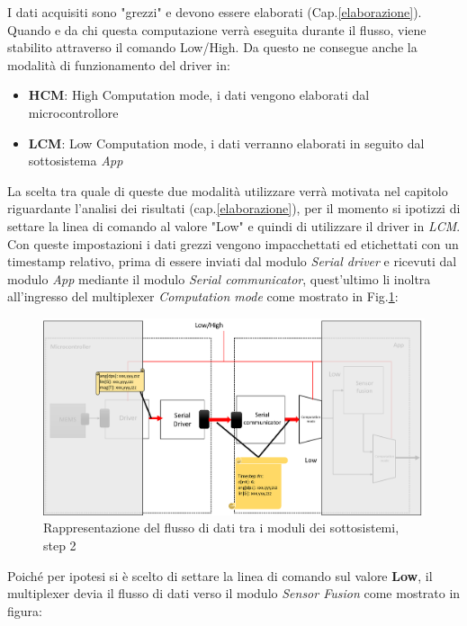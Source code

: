I dati acquisiti sono "grezzi" e devono essere elaborati (Cap.\ref{elaborazione}). Quando e da chi questa computazione verrà eseguita durante il flusso, viene stabilito attraverso il comando Low/High. Da questo ne consegue anche la modalità di funzionamento del driver in:
\begin{itemize}
	\item \textbf{HCM}: High Computation mode, i dati vengono elaborati dal microcontrollore
	\item \textbf{LCM}: Low Computation mode, i dati verranno elaborati in seguito dal sottosistema \textit{App} 
\end{itemize}
La scelta tra quale di queste due modalità utilizzare verrà motivata nel capitolo riguardante l'analisi dei risultati (cap.\ref{elaborazione}), per il momento si ipotizzi di settare la linea di comando al valore "Low" e quindi di utilizzare il driver in \textit{LCM}. Con queste impostazioni i dati grezzi vengono impacchettati ed etichettati con un timestamp relativo, prima di essere inviati dal modulo \textit{Serial driver} e ricevuti dal modulo \textit{App} mediante il modulo \textit{Serial communicator}, quest'ultimo li inoltra all'ingresso del multiplexer \textit{Computation mode} come mostrato in Fig.\ref{fig:flusso2}:
\begin{figure}[H]  
	\centering 
	\includegraphics[scale=0.25 ]{DescrizioneDelSistema/flusso2.png}
	\caption{Rappresentazione del flusso di dati tra i moduli dei sottosistemi, step 2}
	\label{fig:flusso2}
\end{figure}
Poiché per ipotesi si è scelto di settare la linea di comando sul valore \textbf{Low}, il multiplexer devia il flusso di dati verso il modulo \textit{Sensor Fusion} come mostrato in figura:
